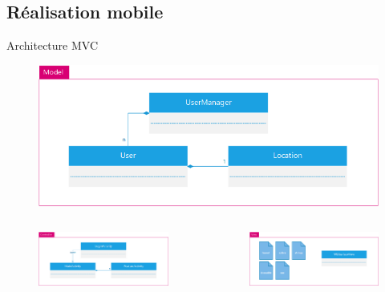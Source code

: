 \documentclass{beamer} %
\begin{document}
  \subsection{Réalisation mobile}
  \begin{frame}{\subsecname}
      \begin{center}
        Architecture MVC
        \begin{figure}
        \includegraphics[width=0.58\linewidth, height=\textheight, keepaspectratio]{android-model.png}
        \end{figure}
      \end{center}

      \vspace*{-8mm}

      \begin{columns}
        \begin{column}{0.58\textwidth}
          \begin{figure}
          \includegraphics[width=\linewidth, height=\textheight, keepaspectratio]{android-controller.png}
          \end{figure}
        \end{column}
        \begin{column}{0.58\textwidth}
          \begin{figure}
          \includegraphics[width=\linewidth, height=\textheight, keepaspectratio]{android-view.png}
          \end{figure}
        \end{column}
      \end{columns}

  \end{frame}
\end{document}
